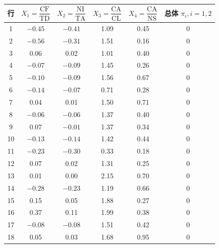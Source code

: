 \begin{mvtable}
\label{tab:11.4}
\begin{tabular}{cccccc}
\toprule
行 & $X_1=\dfrac{\mathrm{CF}}{\mathrm{TD}}$ & $X_2=\dfrac{\mathrm{NI}}{\mathrm{TA}}$ & $X_3=\dfrac{\mathrm{CA}}{\mathrm{CL}}$ & $X_4=\dfrac{\mathrm{CA}}{\mathrm{NS}}$ & 总体 $\pi_i,i=1,2$\\
\midrule
1 & $-0.45$ & $-0.41$ & 1.09 & 0.45 & 0\\
2 & $-0.56$ & $-0.31$ & 1.51 & 0.16 & 0\\
3 & 0.06 & 0.02 & 1.01 & 0.40 & 0\\
4 & $-0.07$ & $-0.09$ & 1.45 & 0.26 & 0\\
5 & $-0.10$ & $-0.09$ & 1.56 & 0.67 & 0\\
6 & $-0.14$ & $-0.07$ & 0.71 & 0.28 & 0\\
7 & 0.04 & 0.01 & 1.50 & 0.71 & 0\\
8 & $-0.06$ & $-0.06$ & 1.37 & 0.40 & 0\\
9 & 0.07 & $-0.01$ & 1.37 & 0.34 & 0\\
10 & $-0.13$ & $-0.14$ & 1.42 & 0.44 & 0\\
11 & $-0.23$ & $-0.30$ & 0.33 & 0.18 & 0\\
12 & 0.07 & 0.02 & 1.31 & 0.25 & 0\\
13 & 0.01 & 0.00 & 2.15 & 0.70 & 0\\
14 & $-0.28$ & $-0.23$ & 1.19 & 0.66 & 0\\
15 & 0.15 & 0.05 & 1.88 & 0.27 & 0\\
16 & 0.37 & 0.11 & 1.99 & 0.38 & 0\\
17 & $-0.08$ & $-0.08$ & 1.51 & 0.42 & 0\\
18 & 0.05 & 0.03 & 1.68 & 0.95 & 0\\
\bottomrule
\end{tabular}
\end{mvtable}
